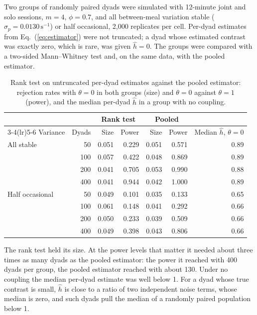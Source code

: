 \documentclass[12pt]{article}
\theoremstyle{definition}
\begin{document}
Two groups of randomly paired dyads were simulated with 12-minute joint and solo
sessions, $m=4$, $\phi=0.7$, and all between-meal variation stable
($\sigma_p=0.0130\,\mathrm{s}^{-1}$) or half occasional, 2{,}000 replicates per cell.
Per-dyad estimates from Eq.~(\ref{eq:estimator}) were not truncated; a dyad whose
estimated contrast was exactly zero, which is rare, was given $\hat h=0$. The groups
were compared with a two-sided Mann--Whitney test and, on the same data, with the
pooled estimator.

\begin{table}[H]
\centering\footnotesize
\caption{Rank test on untruncated per-dyad estimates against the pooled estimator:
rejection rates with $\theta=0$ in both groups (size) and $\theta=0$ against
$\theta=1$ (power), and the median per-dyad $\hat h$ in a group with no coupling.}\label{tab:rank}
\begin{tabular}{@{}lrrrrrr@{}}
\toprule
& & \multicolumn{2}{c}{Rank test} & \multicolumn{2}{c}{Pooled} & \\
\cmidrule(lr){3-4}\cmidrule(lr){5-6}
Variance & Dyads & Size & Power & Size & Power & Median $\hat h$, $\theta=0$\\
\midrule
All stable & 50 & 0.051 & 0.229 & 0.051 & 0.571 & 0.89\\
 & 100 & 0.057 & 0.422 & 0.048 & 0.869 & 0.89\\
 & 200 & 0.041 & 0.705 & 0.053 & 0.990 & 0.88\\
 & 400 & 0.041 & 0.944 & 0.042 & 1.000 & 0.89\\
Half occasional & 50 & 0.049 & 0.101 & 0.035 & 0.133 & 0.65\\
 & 100 & 0.061 & 0.148 & 0.041 & 0.292 & 0.66\\
 & 200 & 0.050 & 0.233 & 0.039 & 0.509 & 0.66\\
 & 400 & 0.049 & 0.398 & 0.043 & 0.806 & 0.66\\
\bottomrule
\end{tabular}
\end{table}

The rank test held its size. At the power levels that matter it needed about three
times as many dyads as the pooled estimator: the power it reached with 400 dyads per
group, the pooled estimator reached with about 130. Under no coupling the median
per-dyad estimate was well below 1. For a dyad whose true contrast is small,
$\hat h$ is close to a ratio of two independent noise terms, whose median is zero,
and such dyads pull the median of a randomly paired population below 1.
\end{document}
